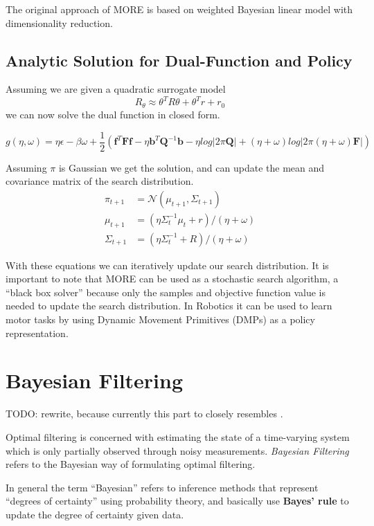 The original approach of MORE is based on weighted Bayesian linear model with
dimensionality reduction.

\subsection{Analytic Solution for Dual-Function and Policy}
Assuming we are given a quadratic surrogate model
$$ R_\theta \approx \theta^T R \theta + \theta^T r + r_0 $$
we can now solve the dual function in closed form.

$$ g(\eta, \omega) = \eta \epsilon - \beta \omega
+ \frac{1}{2} \left(\mathbf{f}^T \mathbf{F} \mathbf{f} - \eta \mathbf{b}^T \mathbf{Q}^{-1}
\mathbf{b} - \eta log |2\pi \mathbf{Q}| + (\eta + \omega) log |2\pi (\eta + \omega)
\mathbf{F}| \right) $$

Assuming $\pi$ is Gaussian we get the solution, and can update the mean and covariance matrix
of the search distribution. 
\begin{align} \label{policy_update}
  \pi_{t+1} &= \mathcal{N}(\mu_{t+1}, \Sigma_{t+1}) \\
  \mu_{t+1} &= (\eta \Sigma_{t}^{-1}\mu_t + r) / (\eta + \omega) \\
  \Sigma_{t+1} &= (\eta \Sigma_t^{-1} + R) / (\eta + \omega)
\end{align}

With these equations we can iteratively update our search distribution.
It is important to note that MORE can be used as a stochastic search algorithm,
a ``black box solver'' because only the samples and objective function value
is needed to update the search distribution.
In Robotics it can be used to learn motor tasks by using Dynamic Movement Primitives
(DMPs) as a policy representation.

\section{Bayesian Filtering}

TODO:  rewrite, because currently this part to closely resembles \citet{sarkka2013bayesian}.

Optimal filtering is concerned with estimating the state of a time-varying system
which is only partially observed through noisy measurements.
\textit{Bayesian Filtering} refers to the Bayesian way of formulating optimal
filtering.

In general the term ``Bayesian'' refers to inference methods that represent
``degrees of certainty'' using probability theory, and basically use \textbf{Bayes' rule}
to update the degree of certainty given data.

